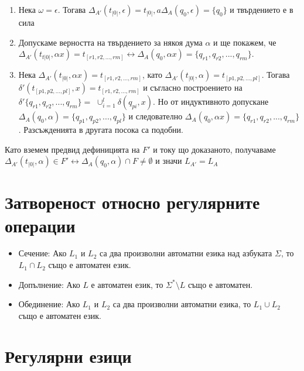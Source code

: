 \documentclass[11pt]{article} %
\begin{document}
\renewcommand{\theenumi}{\alph{enumi}}
\begin{enumerate}
	\item Нека $\omega = \epsilon$. Тогава $\Delta_{A'}(t_{|0|}, \epsilon) = t_{|0|}, a \Delta_{A}(q_{0}, \epsilon)= \{q_{0}\}$ и твърдението е в сила
	\item Допускаме верността на твърдението за някоя дума $\alpha$  и ще покажем, че $\Delta_{A'}(t_{t|0|}, \alpha x) = t_{[r1, r2, ..., rm]} \leftrightarrow \Delta_{A}(q_{0}, \alpha x) = 			\{q_{r1}, q_{r2}, ..., q_{rm}\}$.
	\item Нека $\Delta_{A'}(t_{|0|}, \alpha x) = t_{[r1, r2, ..., rm]}$, като
		$\Delta_{A'}(t_{|0|}, \alpha) = t_{[p1, p2, ..., pl]}$. Тогава $\delta'(t_{[p1, p2, ..., pl]}, x) = t_{[r1, r2, ...,rm]}$ и съгласно построението на $\delta'\{q_{r1}, q_{r2}, 				..., q_{rm} \} = $
		$\cup_{i=1}^{l}\delta(q_{pi}, x).$ Но от индуктивното допускане 
		$\Delta_{A}(q_{0}, \alpha) = \{q_{p1}, q_{p2}, ..., q_{pl}\} $ и следователно 
		$\Delta_{A}(q_{0}, \alpha x) = \{q_{r1}, q_{r2}, ..., q_{rm} \}$. Разсъжденията в другата посока са подобни.
\end{enumerate} \par

Като вземем предвид дефиницията на $F'$ и току що доказаното, получаваме $\Delta_{A'}(t_{|0|}, \alpha) \in F' \leftrightarrow 
\Delta_{A}(q_{0}, \alpha) \cap F \neq \emptyset$ и значи 
$L_{A'} = L_{A}$   

\section{Затвореност относно регулярните операции}
\begin{itemize}[noitemsep]
	\item Сечение: Ако $L_{1}$ и $L_{2}$ са два произволни автоматни езика над азбуката $\Sigma$, то $L_{1}\cap L_{2}$ също е автоматен език.
	\item Допълнение: Ако $L$ е автоматен език, то $\Sigma^{*}\setminus L$ също е автоматен.
	\item Обединение: Ако $L_{1}$ и $L_{2}$ са два произволни автоматни езика, то $L_{1}\cup L_{2}$ също е автоматен език.
\end{itemize}

\section{Регулярни езици}
\end{document}

